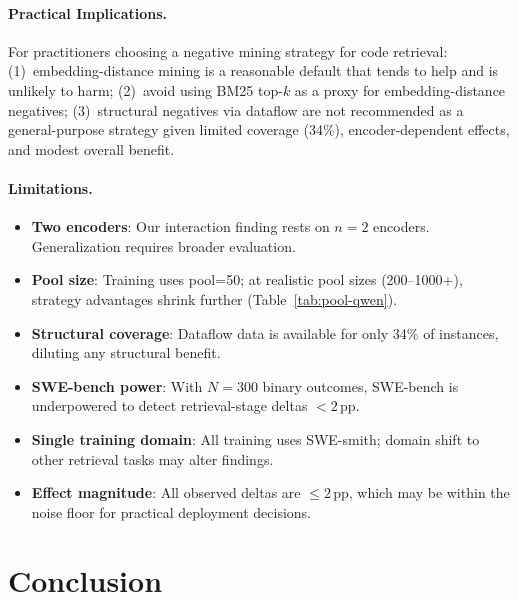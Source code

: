 \documentclass[11pt]{article}
\newcommand{\pp}{\,\text{pp}}
\begin{document}
\paragraph{Practical Implications.}
For practitioners choosing a negative mining strategy for code retrieval:
(1)~embedding-distance mining is a reasonable default that tends to help and is unlikely to harm;
(2)~avoid using BM25 top-$k$ as a proxy for embedding-distance negatives;
(3)~structural negatives via dataflow are not recommended as a general-purpose strategy given limited coverage (34\%), encoder-dependent effects, and modest overall benefit.

\paragraph{Limitations.}
\begin{itemize}
    \item \textbf{Two encoders}: Our interaction finding rests on $n=2$ encoders. Generalization requires broader evaluation.
    \item \textbf{Pool size}: Training uses pool=50; at realistic pool sizes (200--1000+), strategy advantages shrink further (Table~\ref{tab:pool-qwen}).
    \item \textbf{Structural coverage}: Dataflow data is available for only 34\% of instances, diluting any structural benefit.
    \item \textbf{SWE-bench power}: With $N=300$ binary outcomes, SWE-bench is underpowered to detect retrieval-stage deltas $< 2\pp{}$.
    \item \textbf{Single training domain}: All training uses SWE-smith; domain shift to other retrieval tasks may alter findings.
    \item \textbf{Effect magnitude}: All observed deltas are $\leq 2\pp{}$, which may be within the noise floor for practical deployment decisions.
\end{itemize}

\section{Conclusion}
\label{sec:conclusion}
\end{document}
